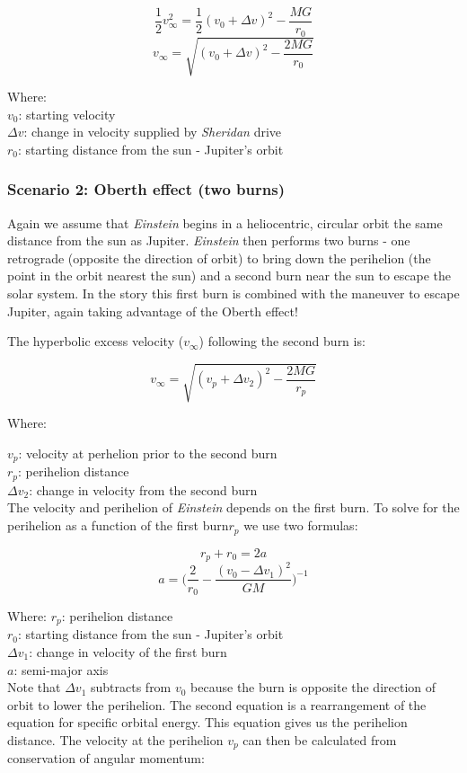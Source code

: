 \documentclass[12pt]{article} %
\begin{document}
$$\frac{1}{2}v_{\infty}^{2} = \frac{1}{2} (v_0 + \Delta v)^2 - \frac{MG}{r_0}$$
$$v_{\infty} = \sqrt{(v_0 + \Delta v)^2-\frac{2MG}{r_0}}$$

Where:\\
$v_0$: starting velocity\\
$\Delta v$: change in velocity supplied by \textit{Sheridan} drive\\
$r_0$: starting distance from the sun - Jupiter's orbit

\subsubsection{Scenario 2: Oberth effect (two burns)}

Again we assume that \textit{Einstein} begins in a heliocentric, circular orbit the same distance from the sun as Jupiter. \textit{Einstein} then performs two burns - one retrograde (opposite the direction of orbit) to bring down the perihelion (the point in the orbit nearest the sun) and a second burn near the sun to escape the solar system. In the story this first burn is combined with the maneuver to escape Jupiter, again taking advantage of the Oberth effect!

The hyperbolic excess velocity ($ v_{\infty}$) following the second burn is:

$$v_{\infty} = \sqrt{(v_p + \Delta v_2)^2-\frac{2MG}{r_p}}$$

Where:

$v_p$: velocity at perhelion prior to the second burn\\
$r_p$: perihelion distance\\
$\Delta v_2$: change in velocity from the second burn\\

The velocity and perihelion of \textit{Einstein} depends on the first burn. To solve for the perihelion as a function of the first burn$r_p$ we use two formulas:

$$r_p + r_0 = 2a$$
$$a = \bigg(\frac{2}{r_0} - \frac{(v_0-\Delta v_1)^2}{GM}\bigg)^{-1}$$

Where:
$r_p$: perihelion distance\\
$r_0$: starting distance from the sun - Jupiter's orbit\\
$\Delta v_1$: change in velocity of the first burn\\
$a$: semi-major axis\\

Note that $\Delta v_1$ subtracts from $v_0$ because the burn is opposite the direction of orbit to lower the perihelion. The second equation is a rearrangement of the equation for specific orbital energy. This equation gives us the perihelion distance. The velocity at the perihelion $v_p$ can then be calculated from conservation of angular momentum:
\end{document}
